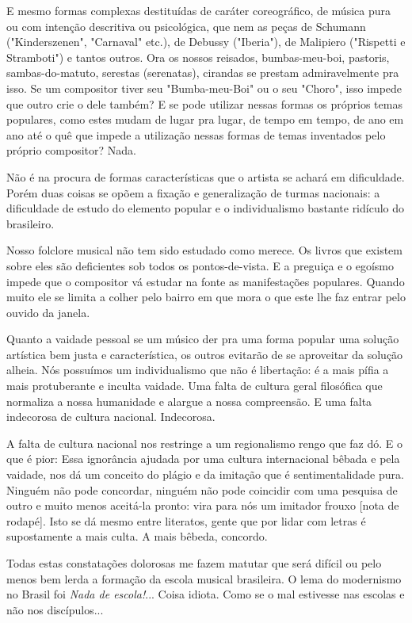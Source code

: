 E mesmo formas complexas destituídas de caráter coreográfico, de música
pura ou com intenção descritiva ou psicológica, que nem as peças de
Schumann ("Kinderszenen", "Carnaval" etc.), de Debussy ("Iberia"), de
Malipiero ("Rispetti e Stramboti") e tantos outros. Ora os nossos
reisados, bumbas-meu-boi, pastoris, sambas-do-matuto, serestas
(serenatas), cirandas se prestam admiravelmente pra isso. Se um
compositor tiver seu "Bumba-meu-Boi" ou o seu "Choro", isso impede que
outro crie o dele também? E se pode utilizar nessas formas os próprios
temas populares, como estes mudam de lugar pra lugar, de tempo em tempo,
de ano em ano até o quê que impede a utilização nessas formas de temas
inventados pelo próprio compositor? Nada.

Não é na procura de formas características que o artista se achará em
dificuldade. Porém duas coisas se opõem a fixação e generalização de
turmas nacionais: a dificuldade de estudo do elemento popular e o
individualismo bastante ridículo do brasileiro.

Nosso folclore musical não tem sido estudado como merece. Os livros que
existem sobre eles são deficientes sob todos os pontos-de-vista. E a
preguiça e o egoísmo impede que o compositor vá estudar na fonte as
manifestações populares. Quando muito ele se limita a colher pelo bairro
em que mora o que este lhe faz entrar pelo ouvido da janela.

Quanto a vaidade pessoal se um músico der pra uma forma popular uma
solução artística bem justa e característica, os outros evitarão de se
aproveitar da solução alheia. Nós possuímos um individualismo que não é
libertação: é a mais pífia a mais protuberante e inculta vaidade. Uma
falta de cultura geral filosófica que normaliza a nossa humanidade e
alargue a nossa compreensão. E uma falta indecorosa de cultura nacional.
Indecorosa.~

A falta de cultura nacional nos restringe a um regionalismo rengo que
faz dó. E o que é pior: Essa ignorância ajudada por uma cultura
internacional bêbada e pela vaidade, nos dá um conceito do plágio e da
imitação que é sentimentalidade pura. Ninguém não pode concordar,
ninguém não pode coincidir com uma pesquisa de outro e muito menos
aceitá-la pronto: vira para nós um imitador frouxo {[}nota de rodapé{]}.
Isto se dá mesmo entre literatos, gente que por lidar com letras é
supostamente a mais culta. A mais bêbeda, concordo.~

Todas estas constatações dolorosas me fazem matutar que será difícil ou
pelo menos bem lerda a formação da escola musical brasileira. O lema do
modernismo no Brasil foi \emph{Nada de escola!}... Coisa idiota. Como se
o mal estivesse nas escolas e não nos discípulos...~

